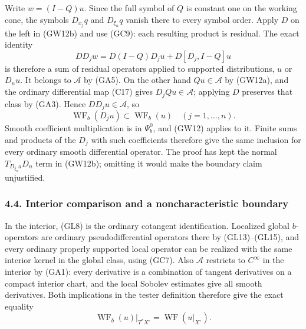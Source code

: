 \documentclass[
  11pt,
]{article}
\begin{document}
Write \(w=(I-Q)u\). Since the full symbol of \(Q\) is constant one on
the working cone, the symbols \(D_{x_j}q\) and \(D_{\xi_n}q\) vanish
there to every symbol order. Apply \(D\) on the left in (GW12b) and use
(GC9): each resulting product is residual. The exact identity \[
 D D_jw
   =D(I-Q)D_ju+D[D_j,I-Q]u
 \tag{GW12c}
\] is therefore a sum of residual operators applied to supported
distributions, \(u\) or \(D_nu\). It belongs to \(\mathcal A\) by (GA5).
On the other hand \(Qu\in\mathcal A\) by (GW12a), and the ordinary
differential map (C17) gives \(D_jQu\in\mathcal A\); applying \(D\)
preserves that class by (GA3). Hence \(DD_ju\in\mathcal A\), so \[
 \operatorname{WF}_b(D_ju)\subset\operatorname{WF}_b(u)
 \quad(j=1,\ldots,n).
 \tag{GW12d}
\] Smooth coefficient multiplication is in \(\Psi_b^0\), and (GW12)
applies to it. Finite sums and products of the \(D_j\) with such
coefficients therefore give the same inclusion for every ordinary smooth
differential operator. The proof has kept the normal
\(T_{D_{\xi_n}a}D_n\) term in (GW12b); omitting it would make the
boundary claim unjustified.

\subsubsection{4.4. Interior comparison and a noncharacteristic
boundary}\label{interior-comparison-and-a-noncharacteristic-boundary}

In the interior, (GL8) is the ordinary cotangent identification.
Localized global \(b\)-operators are ordinary pseudodifferential
operators there by (GL13)--(GL15), and every ordinary properly supported
local operator can be realized with the same interior kernel in the
global class, using (GC7). Also \(\mathcal A\) restricts to \(C^\infty\)
in the interior by (GA1): every derivative is a combination of tangent
derivatives on a compact interior chart, and the local Sobolev estimates
give all smooth derivatives. Both implications in the tester definition
therefore give the exact equality \[
 \operatorname{WF}_b(u)|_{T^*X^\circ}
       =\operatorname{WF}(u|_{X^\circ}).
 \tag{GW13}
\]
\end{document}

